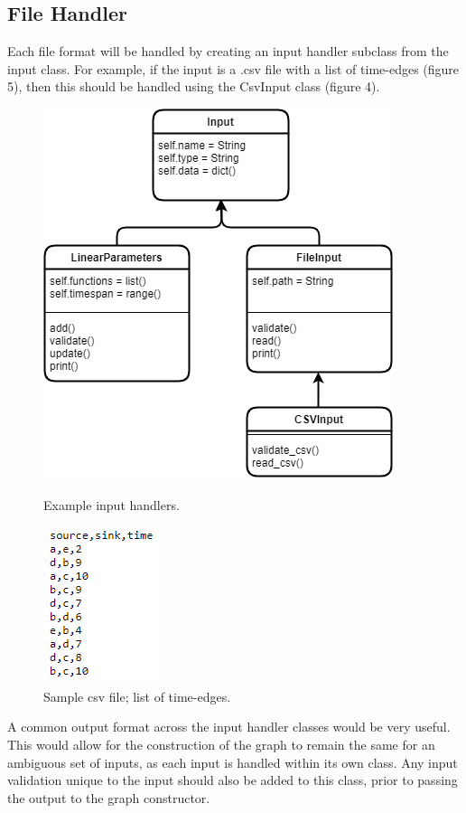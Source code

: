 \begin{design}
\subsection{File Handler}
Each file format will be handled by creating an input handler subclass from the input class. For example, if the input is a .csv file with a list of time-edges (figure 5), then this should be handled using the CsvInput class (figure 4).
\begin{figure}[h]
  \centering
  \begin{minipage}[b]{0.4\textwidth}
    \centering
    \includegraphics[scale=0.6]{images/UML_input.png}
    \caption{Example input handlers.}
  \end{minipage}
  \hfill
  \begin{minipage}[b]{0.4\textwidth}
    \centering
    \includegraphics[scale=0.8]{images/csv.PNG}
    \caption{Sample csv file; list of time-edges.}
  \end{minipage}
\end{figure}
A common output format across the input handler classes would be very useful. This would allow for the construction of the graph to remain the same for an ambiguous set of inputs, as each input is handled within its own class. Any input validation unique to the input should also be added to this class, prior to passing the output to the graph constructor.

\end{design}
